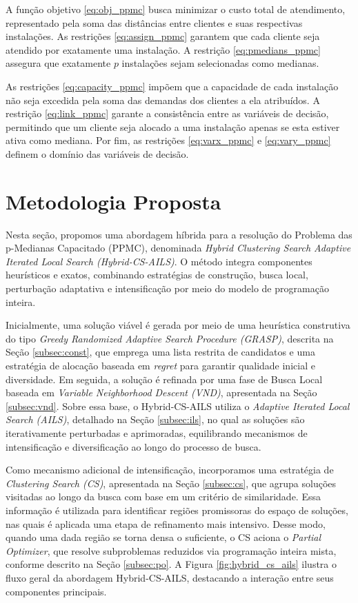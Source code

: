 \documentclass[a4paper,11pt]{article}
\begin{document}
A função objetivo \eqref{eq:obj_ppmc} busca minimizar o custo total de atendimento, representado pela soma das distâncias entre clientes e suas respectivas instalações. As restrições \eqref{eq:assign_ppmc} garantem que cada cliente seja atendido por exatamente uma instalação. A restrição \eqref{eq:pmedians_ppmc} assegura que exatamente $p$ instalações sejam selecionadas como medianas.

As restrições \eqref{eq:capacity_ppmc} impõem que a capacidade de cada instalação não seja excedida pela soma das demandas dos clientes a ela atribuídos. A restrição \eqref{eq:link_ppmc} garante a consistência entre as variáveis de decisão, permitindo que um cliente seja alocado a uma instalação apenas se esta estiver ativa como mediana. Por fim, as restrições \eqref{eq:varx_ppmc} e \eqref{eq:vary_ppmc} definem o domínio das variáveis de decisão.



\section{Metodologia Proposta}
\label{secMet}

Nesta seção, propomos uma abordagem híbrida para a resolução do Problema das p-Medianas Capacitado (PPMC), denominada \textit{Hybrid Clustering Search Adaptive Iterated Local Search (Hybrid-CS-AILS)}. O método integra componentes heurísticos e exatos, combinando estratégias de construção, busca local, perturbação adaptativa e intensificação por meio do modelo de programação inteira.

Inicialmente, uma solução viável é gerada por meio de uma heurística construtiva do tipo \textit{Greedy Randomized Adaptive Search Procedure (GRASP)}, descrita na Seção \ref{subsec:const}, que emprega uma lista restrita de candidatos e uma estratégia de alocação baseada em \textit{regret} para garantir qualidade inicial e diversidade. Em seguida, a solução é refinada por uma fase de Busca Local baseada em \textit{Variable Neighborhood Descent (VND)}, apresentada na Seção \ref{subsec:vnd}. Sobre essa base, o Hybrid-CS-AILS utiliza o \textit{Adaptive Iterated Local Search (AILS)}, detalhado na Seção \ref{subsec:ils}, no qual as soluções são iterativamente perturbadas e aprimoradas, equilibrando mecanismos de intensificação e diversificação ao longo do processo de busca.

Como mecanismo adicional de intensificação, incorporamos uma estratégia de \textit{Clustering Search (CS)}, apresentada na Seção \ref{subsec:cs}, que agrupa soluções visitadas ao longo da busca com base em um critério de similaridade. Essa informação é utilizada para identificar regiões promissoras do espaço de soluções, nas quais é aplicada uma etapa de refinamento mais intensivo. Desse modo, quando uma dada região se torna densa o suficiente, o CS aciona o \textit{Partial Optimizer}, que resolve subproblemas reduzidos via programação inteira mista, conforme descrito na Seção \ref{subsec:po}.  A Figura \ref{fig:hybrid_cs_ails} ilustra o fluxo geral da abordagem Hybrid-CS-AILS, destacando a interação entre seus componentes principais.
\end{document}
